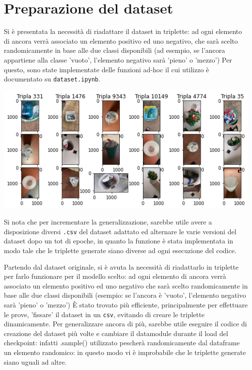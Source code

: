 \documentclass[11pt]{article}
\begin{document}
\section{Preparazione del dataset}

Si è presentata la necessità di riadattare il dataset in triplette: ad ogni elemento di ancora verrà associato un elemento positivo ed uno negativo, che sarà scelto randomicamente in base alle due classi disponibili (ad esempio, se l'ancora appartiene alla classe 'vuoto', l'elemento negativo sarà 'pieno' o 'mezzo')
Per questo, sono state implementate delle funzioni ad-hoc il cui utilizzo è documentato su \texttt{dataset.ipynb}. 

\begin{center}
    \begin{minipage}{0.48\linewidth}
    \includegraphics[width=\linewidth]{triplet_dataset.png}
    \end{minipage}
\end{center}

Si nota che per incrementare la generalizzazione, sarebbe utile avere a disposizione diversi \texttt{.csv} del dataset adattato ed alternare le varie versioni del dataset dopo un tot di epoche, 
in quanto la funzione è stata implementata in modo tale che le triplette generate siano diverse ad ogni esecuzione del codice.

Partendo dal dataset originale, si è avuta la necessità di riadattarlo in triplette per farlo funzionare per il modello scelto: ad ogni elemento di ancora verrà associato un elemento positivo ed uno negativo che sarà scelto randomicamente in base alle due classi disponibili (esempio: se l'ancora è 'vuoto', l'elemento negativo sarà 'pieno' o 'mezzo')
È stato trovato più efficiente, principalmente per effettuare le prove, 'fissare' il dataset in un \texttt{csv}, evitando di creare le triplette dinamicamente. Per generalizzare ancora di più, sarebbe utile eseguire il codice di creazione del dataset più volte e cambiare il datamodule durante il load del checkpoint: infatti .sample() utilizzato pescherà randomicamente dal dataframe un elemento randomico: in questo modo vi è improbabile che le triplette generate siano uguali ad altre.
\end{document}

